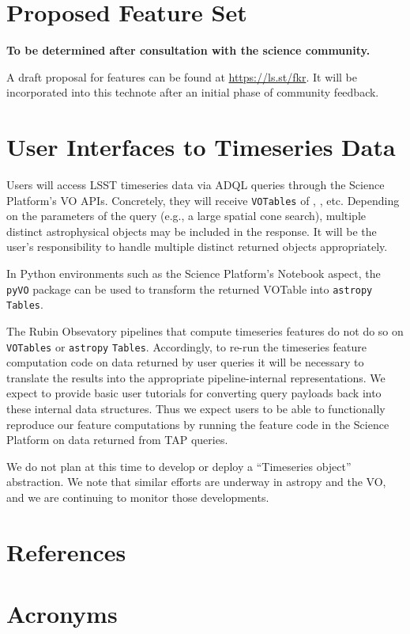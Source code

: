 \documentclass[DM,authoryear,toc]{lsstdoc}
\begin{document}
\section{Proposed Feature Set} \label{sec:proposed_features}

\textbf{To be determined after consultation with the science community.}

A draft proposal for features can be found at \url{https://ls.st/fkr}.
It will be incorporated into this technote after an initial phase of community feedback.

\section{User Interfaces to Timeseries Data} \label{sec:API}

Users will access LSST timeseries data via ADQL queries through the Science Platform's VO APIs.
Concretely, they will receive \texttt{VOTables} of \DIAObjects, \DIASources, etc.
Depending on the parameters of the query (e.g., a large spatial cone search), multiple distinct astrophysical objects may be included in the response.
It will be the user's responsibility to handle multiple distinct returned objects appropriately.

In Python environments such as the Science Platform's Notebook aspect, the \texttt{pyVO} package can be used to transform the returned VOTable into \texttt{astropy} \texttt{Tables}.

The Rubin Obsevatory pipelines that compute timeseries features do not do so on \texttt{VOTables} or \texttt{astropy} \texttt{Tables}.
Accordingly, to re-run the timeseries feature computation code on data returned by user queries it will be necessary to translate the results into the appropriate pipeline-internal representations.
We expect to provide basic user tutorials for converting query payloads back into these internal data structures.
Thus we expect users to be able to functionally reproduce our feature computations by running the feature code in the Science Platform on data returned from TAP queries. 

We do not plan at this time to develop or deploy a ``Timeseries object'' abstraction.
We note that similar efforts are underway in astropy and the VO, and we are continuing to monitor those developments.

\appendix
\section{References} \label{sec:bib}


\section{Acronyms} \label{sec:acronyms}

\end{document}
